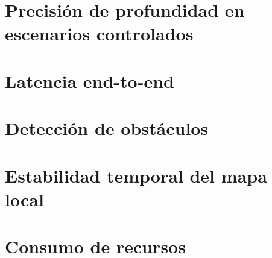 
\section{Precisión de profundidad en escenarios controlados}

\section{Latencia end-to-end}

\section{Detección de obstáculos}

\section{Estabilidad temporal del mapa local}

\section{Consumo de recursos}
